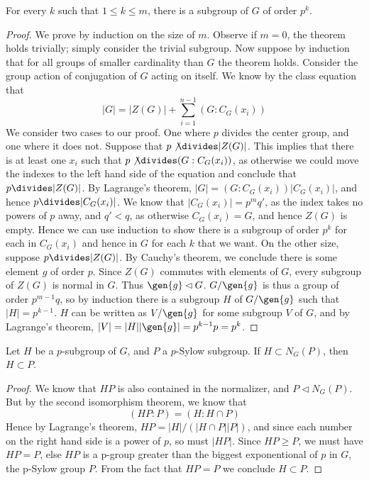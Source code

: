 \begin{lemma}
    For every $k$ such that $1 \leq k \leq m$, there is a subgroup of $G$ of order $p^k$.
\end{lemma}
\begin{proof}
    We prove by induction on the size of $m$. Observe if $m = 0$, the theorem holds trivially; simply consider the trivial subgroup. Now suppose by induction that for all groups of smaller cardinality than $G$ the theorem holds. Consider the group action of conjugation of $G$ acting on itself. We know by the class equation that
    \[ |G| = |Z(G)| + \sum_{i = 1}^{n-1} (G:C_G(x_i)) \]
    We consider two cases to our proof. One where $p$ divides the center group, and one where it does not. Suppose that $p \not\divides |Z(G)|$. This implies that there is at least one $x_i$ such that $p \not \divides (G:C_G(x_i))$, as otherwise we could move the indexes to the left hand side of the equation and conclude that $p \divides|Z(G)|$. By Lagrange's theorem, $|G| = (G:C_G(x_i))|C_G(x_i)|$, and hence $p \divides |C_G(x_i)|$. We know that $|C_G(x_i)| = p^{m}q'$, as the index takes no powers of $p$ away, and $q' < q$, as otherwise $C_G(x_i) = G$, and hence $Z(G)$ is empty. Hence we can use induction to show there is a subgroup of order $p^k$ for each in $C_G(x_i)$ and hence in $G$ for each $k$ that we want. On the other size, suppose $p \divides |Z(G)|$. By Cauchy's theorem, we conclude there is some element $g$ of order $p$. Since $Z(G)$ commutes with elements of $G$, every subgroup of $Z(G)$ is normal in $G$. Thus $\gen{g} \lhd G$. $G/\gen{g}$ is thus a group of order $p^{m-1}q$, so by induction there is a subgroup $H$ of $G/\gen{g}$ such that $|H| = p^{k-1}$. $H$ can be written as $V/\gen{g}$ for some subgroup $V$ of $G$, and by Lagrange's theorem, $|V| = |H||\gen{g}| = p^{k-1}p = p^k$.
\end{proof}

\begin{lemma}
    Let $H$ be a $p$-subgroup of $G$, and $P$ a $p$-Sylow subgroup. If $H \subset N_G(P)$, then $H \subset P$.
\end{lemma}
\begin{proof}
    We know that $HP$ is also contained in the normalizer, and $P \lhd N_G(P)$. But by the second isomorphism theorem, we know that
    \[ (HP: P) = (H: H \cap P) \]
    Hence by Lagrange's theorem, $HP = |H|/(|H \cap P||P|)$, and since each number on the right hand side is a power of $p$, so must $|HP|$. Since $HP \geq P$, we must have $HP = P$, else $HP$ is a p-group greater than the biggest exponentional of $p$ in $G$, the p-Sylow group $P$. From the fact that $HP = P$ we conclude $H \subset P$.
\end{proof}


